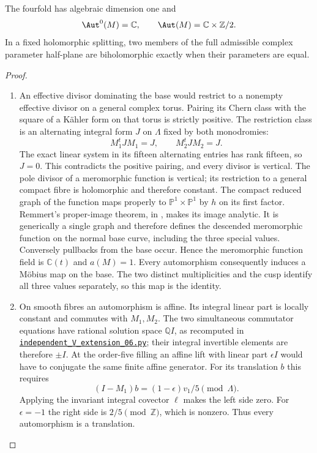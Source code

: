 \begin{theorem}\hypertarget{tag-02R4}{}\label{night:P1A.4}
The fourfold has algebraic dimension one and
\[
\Aut^0(M)=\mathbb C,\qquad
\Aut(M)=\mathbb C\times\mathbb Z/2.
\]
In a fixed holomorphic splitting, two members of the full
admissible complex parameter half-plane are biholomorphic
exactly when their parameters are equal.
\end{theorem}
\begin{proof}
\begin{enumerate}[label={$\langle1\rangle$\arabic*.}]
\item An effective divisor dominating the base would restrict to
a nonempty effective divisor on a general complex torus.
Pairing its Chern class with the square of a Kähler form
on that torus is strictly positive. The restriction class is an alternating integral form $J$ on $\Lambda$
fixed by both monodromies:
\[
M_1^tJM_1=J,\qquad M_2^tJM_2=J.
\]
The exact linear system in its fifteen alternating entries has rank
fifteen, so $J=0$.  This contradicts the positive pairing, and every
divisor is vertical.
The pole divisor of a meromorphic function is vertical;
its restriction to a general compact fibre is holomorphic
and therefore constant. The compact reduced graph of the function maps properly to
$\mathbb P^1\times\mathbb P^1$ by $h$ on its first factor.
Remmert's proper-image theorem, in
\cite[\S7, Satz~1, p.~60]{Grauert60}, makes its image analytic.
It is generically a single graph and therefore defines the descended
meromorphic function on the normal base curve, including the three
special values.
Conversely pullbacks from the base occur. Hence the
meromorphic function field is $\mathbb C(t)$ and $a(M)=1$.
Every automorphism consequently induces a Möbius map on
the base. The two distinct multiplicities and the cusp
identify all three values separately, so this map is the
identity.

\item On smooth fibres an automorphism is affine. Its integral
linear part is locally constant and commutes with $M_1,M_2$.
The two simultaneous commutator equations have rational solution
space $\mathbb QI$, as recomputed in
\href{https://github.com/KokunoYumeto/s6-complex-structure-workbench/blob/83d76022bcd442278b760db9ff438afceed6c6ea/pro_returns/S6_SERIES_GRIND_checkpoint_10_20261120T0211Z/code/current_audits/audit_corrections/code/independent_V_extension_06.py}{\texttt{independent\_V\_extension\_06.py}}; their integral invertible
elements are therefore $\pm I$. At the order-five filling an affine lift with
linear part $\epsilon I$ would have to conjugate the same
finite affine generator. For its translation $b$ this
requires
\[
(I-M_1)b=(1-\epsilon)v_1/5\pmod\Lambda.
\]
Applying the invariant integral covector $\ell$ makes the
left side zero. For $\epsilon=-1$ the right side is
$2/5\pmod\mathbb Z$, which is nonzero. Thus every
automorphism is a translation.


\end{enumerate}
\end{proof}
